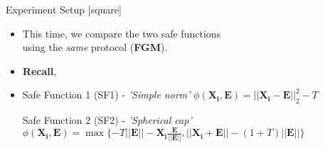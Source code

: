 \begin{frame}{Experiment Setup}
    [square]
    \begin{itemize}
        \item{This time, we compare the two safe functions\\using the \emph{same} protocol (\textbf{FGM}).}
        \item{\textbf{Recall},}
        \item[]{
        \begin{block}{Safe Function 1 (SF1) - \emph{'Simple norm'}}
            $\phi(\pmb{X_i},\pmb{E}) = ||\pmb{X_i}-\pmb{E}||_2^2 - T$
        \end{block}}
        \vspace{0.1cm}
        \begin{block}{Safe Function 2 (SF2) - \emph{'Spherical cap'}}
            $\phi(\pmb{X_i},\pmb{E}) = \max\{-T||\pmb{E}|| - \pmb{X_i}\frac{\pmb{E}}{\pmb{||E||}}, ||\pmb{X_i}+\pmb{E}|| - (1+T)||\pmb{E}||\}$
        \end{block}
    \end{itemize}
\end{frame}